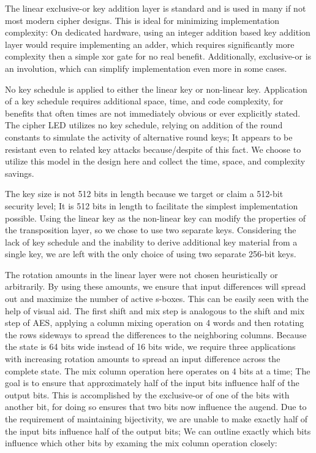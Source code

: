 \documentclass[preprint]{iacrtrans}
\begin{document}
The linear exclusive-or key addition layer is standard and is used in many if not most modern cipher designs. This is ideal for minimizing implementation complexity: On dedicated hardware, using an integer addition based key addition layer would require implementing an adder, which requires significantly more complexity then a simple xor gate for no real benefit. Additionally, exclusive-or is an involution, which can simplify implementation even more in some cases. 

No key schedule is applied to either the linear key or non-linear key. Application of a key schedule requires additional space, time, and code complexity, for benefits that often times are not immediately obvious or ever explicitly stated. The cipher LED utilizes no key schedule, relying on addition of the round constants to simulate the activity of alternative round keys; It appears to be resistant even to related key attacks because/despite of this fact. We choose to utilize this model in the design here and collect the time, space, and complexity savings.

The key size is not 512 bits in length because we target or claim a 512-bit security level; It is 512 bits in length to facilitate the simplest implementation possible. Using the linear key as the non-linear key can modify the properties of the transposition layer, so we chose to use two separate keys. Considering the lack of key schedule and the inability to derive additional key material from a single key, we are left with the only choice of using two separate 256-bit keys. 

The rotation amounts in the linear layer were not chosen heuristically or arbitrarily. By using these amounts, we ensure that input differences will spread out and maximize the number of active s-boxes. This can be easily seen with the help of visual aid. The first shift and mix step is analogous to the shift and mix step of AES, applying a column mixing operation on 4 words and then rotating the rows sideways to spread the differences to the neighboring columns. Because the state is 64 bits wide instead of 16 bits wide, we require three applications with increasing rotation amounts to spread an input difference across the complete state. The mix column operation here operates on 4 bits at a time; The goal is to ensure that approximately half of the input bits influence half of the output bits. This is accomplished by the exclusive-or of one of the bits with another bit, for doing so ensures that two bits now influence the augend. Due to the requirement of maintaining bijectivity, we are unable to make exactly half of the input bits influence half of the output bits; We can outline exactly which bits influence which other bits by examing the mix column operation closely:
\end{document}
